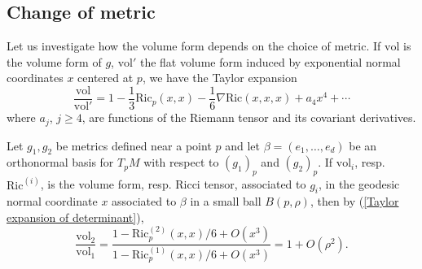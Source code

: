 \documentclass[reqno,12pt,letterpaper]{amsart}
\newcommand{\Ric}{\mathrm{Ric}}
\DeclareMathOperator{\grad}{grad}
\newcommand{\vol}{\mathrm{vol}}
\theoremstyle{definition}
\numberwithin{equation}{section}
\begin{document}

\subsection{Change of metric}\label{change of metric}
Let us investigate how the volume form depends on the choice of metric.
If $\vol$ is the volume form of $g$, $\vol'$ the flat volume form induced by exponential normal coordinates $x$ centered at $p$, we have
the Taylor expansion \cite[p59]{chow2006hamilton}
\begin{equation}\label{Taylor expansion of determinant}
\frac{\vol}{\vol'} = 1 - \frac{1}{3} \Ric_p(x, x) - \frac{1}{6} \nabla \Ric(x, x, x) + a_4x^4 + \cdots
\end{equation}
where $a_j$, $j \geq 4$, are functions of the Riemann tensor and its covariant derivatives.

Let $g_1,g_2$ be metrics defined near a point $p$ and let $\beta = (e_1, \dots, e_d)$ be an orthonormal basis for $T_pM$ with respect to $(g_1)_p$ and $(g_2)_p$.
If $\vol_i$, resp. $\Ric^{(i)}$, is the volume form, resp. Ricci tensor, associated to $g_i$, in the geodesic normal coordinate $x$ associated to $\beta$ in a small ball $B(p, \rho)$, then by (\ref{Taylor expansion of determinant}),
\begin{equation}\label{change of volume form}
\frac{\vol_2}{\vol_1} = \frac{1 - \Ric_p^{(2)}(x, x)/6 + O(x^3)}{1 - \Ric_p^{(1)}(x, x)/6 + O(x^3)} = 1 + O(\rho^2).
\end{equation}

\end{document}
